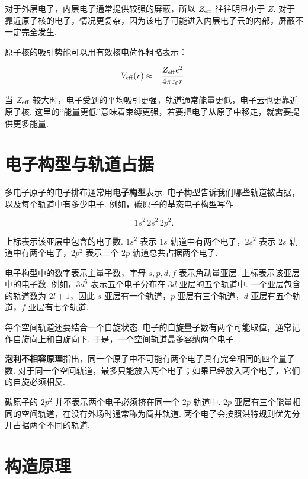 \documentclass[UTF8,11pt,a4paper,openany]{ctexbook}
\newcommand{\term}[1]{\textbf{#1}}
\begin{document}
对于外层电子，内层电子通常提供较强的屏蔽，所以 $Z_{\rm eff}$ 往往明显小于 $Z$. 对于靠近原子核的电子，情况更复杂，因为该电子可能进入内层电子云的内部，屏蔽不一定完全发生. 

原子核的吸引势能可以用有效核电荷作粗略表示：

\[
V_{\rm eff}(r)
\approx
-\frac{Z_{\rm eff}e^2}{4\pi\varepsilon_0 r}.
\]

当 $Z_{\rm eff}$ 较大时，电子受到的平均吸引更强，轨道通常能量更低，电子云也更靠近原子核. 这里的“能量更低”意味着束缚更强，若要把电子从原子中移走，就需要提供更多能量. 

\section{电子构型与轨道占据}

多电子原子的电子排布通常用\term{电子构型}表示. 电子构型告诉我们哪些轨道被占据，以及每个轨道中有多少电子. 例如，碳原子的基态电子构型写作

\[
1s^2\,2s^2\,2p^2.
\]

上标表示该亚层中包含的电子数. $1s^2$ 表示 $1s$ 轨道中有两个电子，$2s^2$ 表示 $2s$ 轨道中有两个电子，$2p^2$ 表示三个 $2p$ 轨道总共占据两个电子. 

\begin{notationbox}
电子构型中的数字表示主量子数，字母 $s,p,d,f$ 表示角动量亚层. 上标表示该亚层中的电子数. 例如，$3d^5$ 表示五个电子分布在 $3d$ 亚层的五个轨道中. 一个亚层包含的轨道数为 $2l+1$，因此 $s$ 亚层有一个轨道，$p$ 亚层有三个轨道，$d$ 亚层有五个轨道，$f$ 亚层有七个轨道. 
\end{notationbox}

每个空间轨道还要结合一个自旋状态. 电子的自旋量子数有两个可能取值，通常记作自旋向上和自旋向下. 于是，一个空间轨道最多容纳两个电子. 

\begin{definitionbox}
\term{泡利不相容原理}指出，同一个原子中不可能有两个电子具有完全相同的四个量子数. 对于同一个空间轨道，最多只能放入两个电子；如果已经放入两个电子，它们的自旋必须相反. 
\end{definitionbox}

碳原子的 $2p^2$ 并不表示两个电子必须挤在同一个 $2p$ 轨道中. $2p$ 亚层有三个能量相同的空间轨道，在没有外场时通常称为简并轨道. 两个电子会按照洪特规则优先分开占据两个不同的轨道. 

\section{构造原理}
\end{document}
